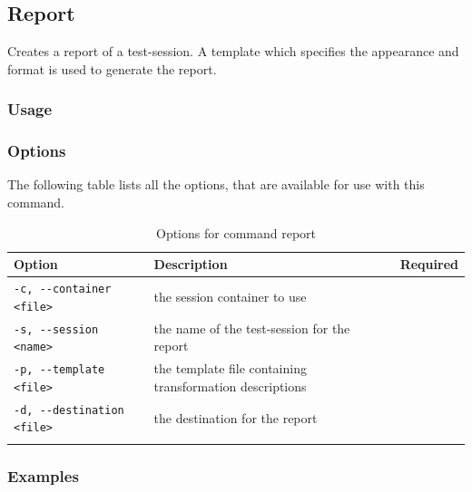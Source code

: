 \subsection{Report}\label{Command-Report}
Creates a report of a test-session. A template which specifies the appearance and format is used to generate the report.
\subsubsection{Usage}\label{command:re:usage}
\begin{quote}
\end{quote}

\subsubsection{Options}\label{command:re:options}
The following table lists all the options, that are available for use with this command.
\begin{longtable}{|l|p{4cm}|c|}\hline
   {\textbf{Option}} & 
   {\textbf{Description}} & 
   {\textbf{Required}} \\\hline \hline \endhead
   \verb$-c, --container <file>$ & the session container to use & \x \\\hline
   \verb$-s, --session <name>$ & the name of the test-session for the report & \x \\\hline
   \verb$-p, --template <file>$ & the template file containing transformation descriptions & \x \\\hline
   \verb$-d, --destination <file>$ & the destination for the report & \x \\\hline
  \caption{Options for command report}
  \label{fr_tb:Options for command report}
\end{longtable}

\subsubsection{Examples}\label{command:re:examples}


